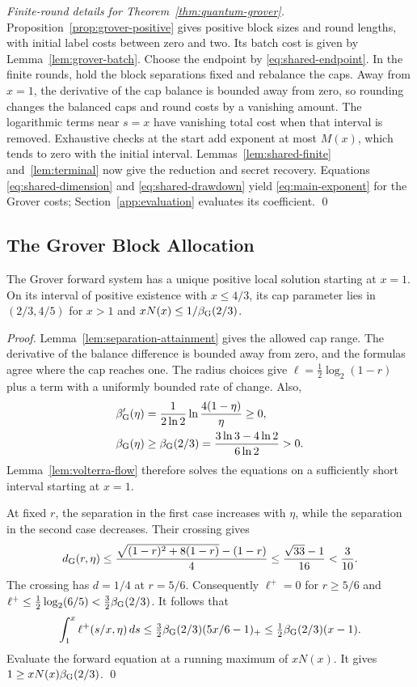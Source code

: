 \documentclass[runningheads,envcountsame,envcountsect,orivec]{llncs}
\begin{document}
\begin{proof}[Finite-round details for Theorem~\ref{thm:quantum-grover}]
Proposition~\ref{prop:grover-positive} gives positive block sizes
and round lengths, with initial label costs between zero and two.
Its batch cost is given by Lemma~\ref{lem:grover-batch}.
Choose the endpoint by \eqref{eq:shared-endpoint}.
In the finite rounds, hold the block separations fixed and
rebalance the caps. Away from $x=1$, the derivative of the cap
balance is bounded away from zero, so rounding changes the
balanced caps and round costs by a vanishing amount.
The logarithmic terms near $s=x$ have vanishing total cost
when that interval is removed.
Exhaustive checks at the start add exponent at most $M(x)$,
which tends to zero with the initial interval.
Lemmas~\ref{lem:shared-finite} and~\ref{lem:terminal} now give
the reduction and secret recovery. Equations
\eqref{eq:shared-dimension} and \eqref{eq:shared-drawdown}
yield \eqref{eq:main-exponent} for the Grover costs;
Section~\ref{app:evaluation} evaluates its coefficient.
\qed
\end{proof}

\subsection{The Grover Block Allocation}

\begin{lemma}
\label{lem:g-bounded-profile}
The Grover forward system has a unique positive local solution
starting at $x=1$. On its interval of positive existence with
$x\le4/3$, its cap parameter lies in $(2/3,4/5)$ for $x>1$ and
$xN(x)\le1/\beta_{\rm G}(2/3)$.
\end{lemma}

\begin{proof}
Lemma~\ref{lem:separation-attainment} gives the allowed cap
range. The derivative of the balance difference is bounded away
from zero, and the formulas agree where the cap reaches one.
The radius choices give $\ell=\tfrac12\log_2(1-r)$ plus a term
with a uniformly bounded rate of change.
Also,
\begin{align*}
 \beta_{\rm G}'(\eta)
 &=\frac1{2\ln2}\ln\frac{4(1-\eta)}{\eta}\ge0,\\
 \beta_{\rm G}(\eta)&\ge\beta_{\rm G}(2/3)
 =\frac{3\ln3-4\ln2}{6\ln2}>0.
\end{align*}
Lemma~\ref{lem:volterra-flow} therefore solves the equations
on a sufficiently short interval starting at $x=1$.

At fixed $r$, the separation in the first case increases with
$\eta$, while the separation in the second case decreases. Their crossing gives
\[
 d_{\rm G}(r,\eta)
 \le\frac{\sqrt{(1-r)^2+8(1-r)}-(1-r)}4
 \le\frac{\sqrt{33}-1}{16}<\frac3{10}.
\]
The crossing has $d=1/4$ at $r=5/6$.
Consequently $\ell^+=0$ for $r\ge5/6$ and
$\ell^+\le\tfrac12\log_2(6/5)<\tfrac32\beta_{\rm G}(2/3)$.
It follows that
\[
 \int_1^x\ell^+(s/x,\eta)\,ds
 \le\tfrac32\beta_{\rm G}(2/3)(5x/6-1)_+
 \le\tfrac12\beta_{\rm G}(2/3)(x-1).
\]
Evaluate the forward equation at a running maximum of $xN(x)$.
It gives $1\ge xN(x)\beta_{\rm G}(2/3)$.
\qed
\end{proof}
\end{document}

